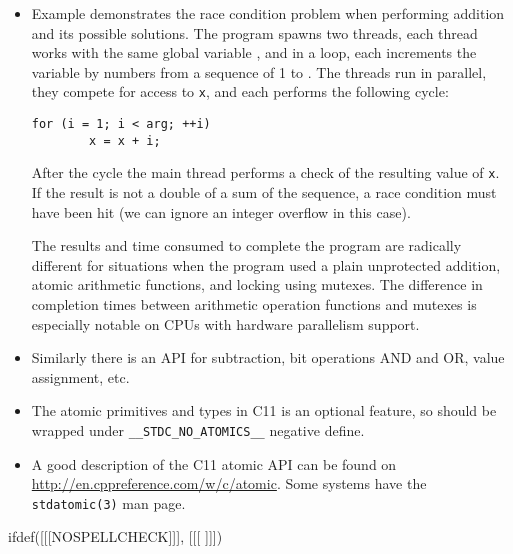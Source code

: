 \begin{itemize}
\item \label{ATOMIC_ADD} Example  demonstrates
the race condition problem when performing addition and its possible solutions.
The program spawns two threads, each thread works with the same global variable
, and in a loop, each increments the variable by numbers from a sequence
of 1 to .  The threads run in parallel, they compete for
access to \texttt{x}, and each performs the following cycle:

\begin{verbatim}
for (i = 1; i < arg; ++i)
        x = x + i;
\end{verbatim}

After the cycle the main thread performs a check of the resulting value of
\texttt{x}.   If the result is not a double of a sum of the sequence, a race
condition must have been hit (we can ignore an integer overflow in this case).
\par The results and time consumed to complete the program are radically
different for situations when the program used a plain unprotected addition,
atomic arithmetic functions, and locking using mutexes.  The difference in
completion times between arithmetic operation functions and mutexes is
especially notable on CPUs with hardware parallelism support.
\item Similarly there is an API for subtraction, bit operations AND and OR,
value assignment, etc.
\item The atomic primitives and types in C11 is an optional feature, so should
be wrapped under \texttt{\_\_STDC\_NO\_ATOMICS\_\_} negative define.
\item A good description of the C11 atomic API can be found on
\url{http://en.cppreference.com/w/c/atomic}. Some systems have the
\texttt{stdatomic(3)} man page.
\end{itemize}



ifdef([[[NOSPELLCHECK]]], [[[
]]])

